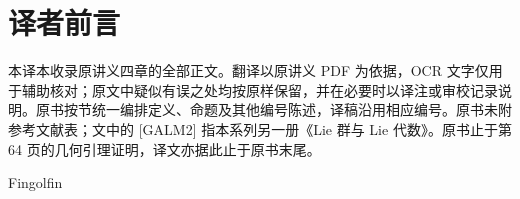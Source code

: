\documentclass[BookTitleCN={半单 Lie 代数及其表示},OriginalAuthor={Jean-François Dat},OriginalYear={2013-2014},Translator={Fingolfin},TranslationDate={2026年10月25日},ModelUsed={ZCode / Codex},BibStyle=numeric]{mathtranslation}
\begin{document}
\hypersetup{pageanchor=false}
\makecover
\cleardoublepage
\hypersetup{pageanchor=true}
\frontmatter
\chapter*{译者前言}
本译本收录原讲义四章的全部正文。翻译以原讲义 PDF 为依据，OCR 文字仅用于辅助核对；原文中疑似有误之处均按原样保留，并在必要时以译注或审校记录说明。原书按节统一编排定义、命题及其他编号陈述，译稿沿用相应编号。原书未附参考文献表；文中的 [GALM2] 指本系列另一册《Lie 群与 Lie 代数》。原书止于第 64 页的几何引理证明，译文亦据此止于原书末尾。
\par\medskip\hfill Fingolfin
\makecontents
\mainmatter














\backmatter
\printterminology
\end{document}
